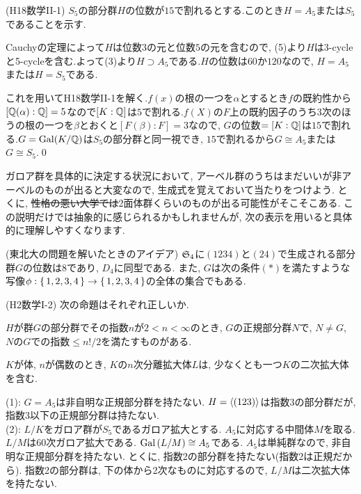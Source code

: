 \begin{eg} (H18数学II-1) \label{eg:H18_II_1}
$S_5$の部分群$H$の位数が$15$で割れるとする.このとき$H=A_5$または$S_5$であることを示す.\par
Cauchyの定理によって$H$は位数$3$の元と位数$5$の元を含むので, (5)より$H$は3-cycleと5-cycleを含む.よって(3)より$H\supset A_{5}$である.$H$の位数は$60$か$120$なので, $H=A_5$または$H=S_5$である.\par
これを用いてH18数学II-1を解く.$f(x)$の根の一つを$\alpha$とするとき$f$の既約性から$[\mathbb{Q}(\alpha):\mathbb{Q}] = 5$なので$[K:\mathbb{Q}]$は$5$で割れる.$f(X)$の$F$上の既約因子のうち$3$次のほうの根の一つを$\beta$とおくと$[F(\beta):F] = 3$なので, $G$の位数$=[K:\mathbb{Q}]$は$15$で割れる.$G=\operatorname{Gal}(K/\mathbb{Q})$は$S_5$の部分群と同一視でき, $15$で割れるから$G \cong A_{5}$または$G\cong S_5$.\qed
\end{eg}

ガロア群を具体的に決定する状況において, アーベル群のうちはまだいいが非アーベルのものが出ると大変なので, 生成式を覚えておいて当たりをつけよう. とくに, \sout{性格の悪い大学では}2面体群くらいのものが出る可能性がそこそこある.
この説明だけでは抽象的に感じられるかもしれませんが, 次の表示を用いると具体的に理解しやすくなります.
\begin{prop} (東北大の問題を解いたときのアイデア)
$\mathfrak{S}_{4}$に$(1234)$と$(24)$で生成される部分群$G$の位数は8であり, $D_{4}$に同型である. また, $G$は次の条件$(\ast)$を満たすような写像$\phi:\set{1,2,3,4}\to \set{1,2,3,4}$の全体の集合でもある.

\end{prop}



\begin{egprob} (H2数学I-2)
次の命題はそれぞれ正しいか.
\ben
\item $H$が群$G$の部分群でその指数$n$が$2<n<\infty$のとき, $G$の正規部分群$N$で, $N\neq G$, $N$の$G$での指数$\leq n!/2$を満たすものがある.
\item $K$が体, $n$が偶数のとき, $K$の$n$次分離拡大体$L$は, 少なくとも一つ$K$の二次拡大体を含む.
\een
\end{egprob}
\begin{egans}
(1): $G=A_5$は非自明な正規部分群を持たない. $H=\langle (123)\rangle$は指数3の部分群だが, 指数3以下の正規部分群は持たない. \\

(2): $L/K$をガロア群が$S_5$であるガロア拡大とする. $A_5$に対応する中間体$M$を取る. $L/M$は60次ガロア拡大である. $\operatorname{Gal}{(L/M)}\cong A_5$である. $A_5$は単純群なので, 非自明な正規部分群を持たない. とくに, 指数2の部分群を持たない(指数2は正規だから). 指数2の部分群は, 下の体から2次なものに対応するので, $L/M$は二次拡大体を持たない.
\end{egans}



